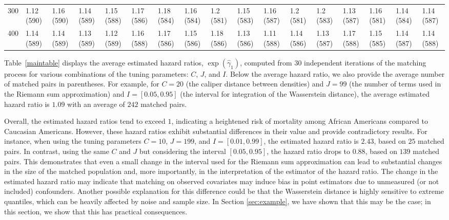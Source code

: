 \begin{landscape}
\begin{tabular}{L{1cm}|C{1cm}C{1cm}C{1cm}C{1cm}C{1cm}C{1cm}C{1cm}C{1cm}C{1cm}C{1cm}C{1cm}C{1cm}C{1cm}C{1cm}C{1cm}C{1cm}}
  300 & 1.12 (590) & 1.16 (590) & 1.14 (589) & 1.15 (588) & 1.17 (586) & 1.18 (584) & 1.16 (584) & 1.2 (581) & 1.15 (583) & 1.16 (587) & 1.2 (581) & 1.2 (583) & 1.13 (587) & 1.16 (581) & 1.14 (584) & 1.14 (587) \\ 
  400 & 1.14 (589) & 1.14 (589) & 1.13 (589) & 1.12 (589) & 1.16 (588) & 1.17 (586) & 1.15 (586) & 1.18 (586) & 1.13 (586) & 1.11 (588) & 1.14 (586) & 1.13 (587) & 1.17 (588) & 1.15 (585) & 1.14 (587) & 1.14 (588) \\ 
  \hline
\bottomrule
\end{tabular}
\label{maintable}
\end{landscape}


Table~\ref{maintable} displays the average estimated hazard ratios, $\exp(\hat{\gamma}_1)$, computed from $30$ independent iterations of the matching process for various combinations of the tuning parameters: $C$, $J$, and $I$. Below the average hazard ratio, we also provide the average number of matched pairs in parentheses. For example, for $C=20$ (the caliper distance between densities) and $J=99$ (the number of terms used in the Riemann sum approximation) and $I=[0.05,0.95]$ (the interval for integration of the Wasserstein distance), the average estimated hazard ratio is $1.09$ with an average of $242$ matched pairs. 

Overall, the estimated hazard ratios tend to exceed $1$, indicating a heightened risk of mortality among African Americans compared to Caucasian Americans. However, these hazard ratios exhibit substantial differences in their value and provide contradictory results. For instance, when using the tuning parameters $C=10$, $J=199$, and $I=[0.01,0.99]$, the estimated hazard ratio is $2.43$, based on $25$ matched pairs. In contrast, using the same $C$ and $J$ but considering the interval $[0.05,0.95]$, the hazard ratio drops to $0.88$, based on $139$ matched pairs. This demonstrates that even a small change in the interval used for the Riemann sum approximation can lead to substantial changes in the size of the matched population and, more importantly, in the interpretation of the estimator of the hazard ratio. The change in the estimated hazard ratio may indicate that matching on observed covariates may induce bias in point estimators due to unmeasured (or not included) confounders. Another possible explanation for this difference could be that the Wasserstein distance is highly sensitive to extreme quantiles, which can be heavily affected by noise and sample size. In Section \ref{sec:example}, we have shown that this may be the case; in this section, we show that this has practical consequences. 

